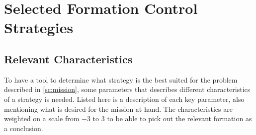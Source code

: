 \chapter{Selected Formation Control Strategies}
\label{ch:selformctrl}


\section{Relevant Characteristics}
To have a tool to determine what strategy is the best suited for the
problem described in \vref{sc:mission}, some parameters that describes
different characteristics of a strategy is needed. Listed here is a
description of each key parameter, also mentioning what is desired for
the mission at hand. The characteristics are weighted on a scale from $-3$ to $3$ to be able to pick out the relevant formation as a conclusion.

